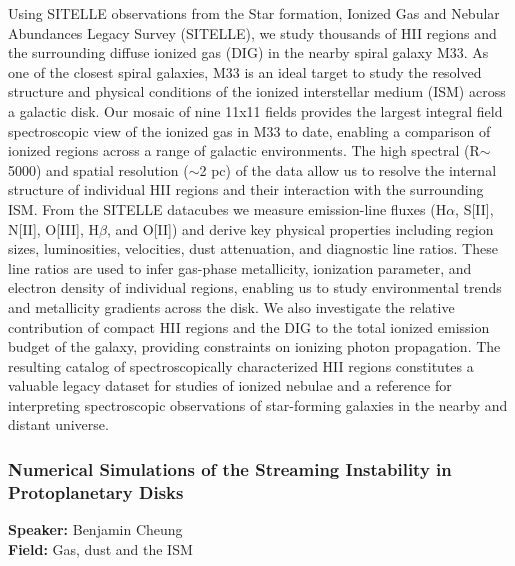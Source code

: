 Using SITELLE observations from the Star formation, Ionized Gas and Nebular Abundances Legacy Survey (SITELLE), we study thousands of HII regions and the surrounding diffuse ionized gas (DIG) in the nearby spiral galaxy M33. As one of the closest spiral galaxies, M33 is an ideal target to study the resolved structure and physical conditions of the ionized interstellar medium (ISM) across a galactic disk. Our mosaic of nine 11x11 fields provides the largest integral field spectroscopic view of the ionized gas in M33 to date, enabling a comparison of ionized regions across a range of galactic environments. The high spectral (R$\sim$5000) and spatial resolution ($\sim$2 pc) of the data allow us to resolve the internal structure of individual HII regions and their interaction with the surrounding ISM. From the SITELLE datacubes we measure emission-line fluxes (H$\alpha$, S[II], N[II], O[III], H$\beta$, and O[II]) and derive key physical properties including region sizes, luminosities, velocities, dust attenuation, and diagnostic line ratios. These line ratios are used to infer gas-phase metallicity, ionization parameter, and electron density of individual regions, enabling us to study environmental trends and metallicity gradients across the disk. We also investigate the relative contribution of compact HII regions and the DIG to the total ionized emission budget of the galaxy, providing constraints on ionizing photon propagation. The resulting catalog of spectroscopically characterized HII regions constitutes a valuable legacy dataset for studies of ionized nebulae and a reference for interpreting spectroscopic observations of star-forming galaxies in the nearby and distant universe.

\hypertarget{abstract-talk-260}{}\label{abstract-page-talk-260}
\subsubsection*{Numerical Simulations of the Streaming Instability in Protoplanetary Disks}
\textbf{Speaker:} Benjamin Cheung\\
\textbf{Field:} Gas, dust and the ISM

